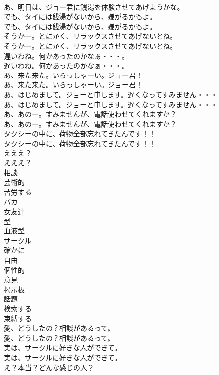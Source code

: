 \documentclass[8pt]{extreport}
\begin{document}
\begin{CJK}{UTF8}{min}
\\	あ、明日は、ジョー君に銭湯を体験させてあげようかな。 
\\	でも、タイには銭湯がないから、嫌がるかもよ。	
\\	でも、タイには銭湯がないから、嫌がるかもよ。 
\\	そうかー。とにかく、リラックスさせてあげないとね。	
\\	そうかー。とにかく、リラックスさせてあげないとね。 
\\	遅いわね。何かあったのかなぁ・・・。	
\\	遅いわね。何かあったのかなぁ・・・。 
\\	あ、来た来た。いらっしゃーい。ジョー君！	
\\	あ、来た来た。いらっしゃーい。ジョー君！ 
\\	あ、はじめまして。ジョーと申します。遅くなってすみません・・・	
\\	あ、はじめまして。ジョーと申します。遅くなってすみません・・・ 
\\	あ、あのー。すみませんが、電話使わせてくれますか？	
\\	あ、あのー。すみませんが、電話使わせてくれますか？ 
\\	タクシーの中に、荷物全部忘れてきたんです！！	
\\	タクシーの中に、荷物全部忘れてきたんです！！ 
\\	えええ？	
\\	えええ？ 
\\	相談
\\	芸術的
\\	苦労する
\\	バカ
\\	女友達
\\	型
\\	血液型
\\	サークル
\\	確かに
\\	自由
\\	個性的
\\	意見
\\	掲示板
\\	話題
\\	検索する
\\	束縛する
\\	愛、どうしたの？相談があるって。	
\\	愛、どうしたの？相談があるって。 
\\	実は、サークルに好きな人ができて。	
\\	実は、サークルに好きな人ができて。 
\\	え？本当？どんな感じの人？	

\end{CJK}
\end{document}
